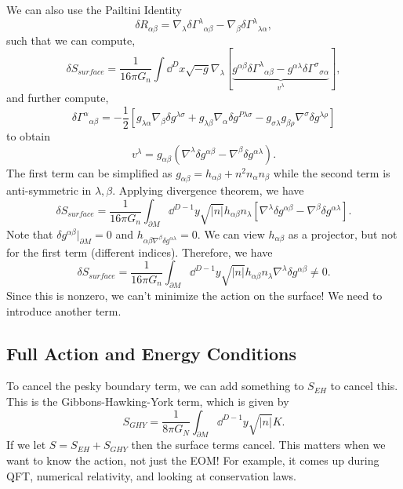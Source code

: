\documentclass{article}
\numberwithin{equation}{section}
\begin{document}
 We can also use the Pailtini Identity 
 \begin{equation}
    \delta R_{\alpha\beta} = \nabla_\lambda \delta \Gamma^{\lambda}{}_{\alpha\beta}- \nabla_\beta \delta\Gamma^{\lambda}{}_{\lambda\alpha},
 \end{equation}
 such that we can compute,
 \begin{equation}
    \delta S_{surface} = \frac{1}{16\pi G_n}\int \dd^{D}{x} \sqrt{-g}\nabla_\lambda\left[\underbrace{g^{\alpha\beta}\delta\Gamma^{\lambda}{}_{\alpha\beta}-g^{\alpha\lambda}\delta \Gamma^{\sigma}{}_{\sigma\alpha}}_{v^{\lambda}}\right],
 \end{equation}
 and further compute,
 \begin{equation}
    \delta \Gamma^{\alpha}{}_{\alpha\beta} = -\frac{1}{2}\left[g_{\lambda\alpha}\nabla_\beta \delta g^{\lambda\sigma} + g_{\lambda\beta}\nabla_\alpha \delta g^{P\lambda\sigma} - g_{\sigma\lambda}g_{\beta\rho}\nabla^{\sigma}\delta g^{\lambda\rho}\right]
 \end{equation}
 to obtain 
 \begin{equation}
    v^{\lambda}=g_{\alpha\beta}(\nabla^\lambda \delta g^{\alpha\beta} - \nabla^\beta \delta g^{\alpha\lambda}).
 \end{equation}
 The first term can be simplified as $g_{\alpha\beta}=h_{\alpha\beta}+n^2 n_{\alpha}n_\beta$ while the second term is anti-symmetric in $\lambda,\beta.$ Applying divergence theorem, we have 
 \begin{equation}
    \delta S_{surface} = \frac{1}{16\pi G_n}\int_{\partial M}\dd^{D-1}y\sqrt{|n|}h_{\alpha\beta}n_{\lambda}\left[\nabla^\lambda \delta g^{\alpha\beta} - \nabla^\beta \delta g^{\alpha \lambda}\right].
 \end{equation}
 Note that $\delta g^{\alpha\beta}|_{\partial M}=0$ and $h_{\alpha\beta\nabla^\beta \delta g^{\alpha\lambda}}=0.$ We can view $h_{\alpha\beta}$ as a projector, but not for the first term (different indices). Therefore, we have 
 \begin{equation}
    \delta S_{surface} = \frac{1}{16\pi G_n}\int_{\partial M}\dd^{D-1}y\sqrt{|n|}h_{\alpha\beta}n_\lambda \nabla^\lambda \delta g^{\alpha\beta}\neq 0.
 \end{equation}
 Since this is nonzero, we can't minimize the action on the surface! We need to introduce another term.
\subsection{Full Action and Energy Conditions}
To cancel the pesky boundary term, we can add something to $S_{EH}$ to cancel this. This is the Gibbons-Hawking-York term, which is given by
\begin{equation}
   S_{GHY} = \frac{1}{8\pi G_N}\int_{\partial M}\dd^{D-1}{y}\sqrt{|n|}K.
\end{equation}
If we let $S=S_{EH}+S_{GHY}$ then the surface terms cancel. This matters when we want to know the action, not just the EOM! For example, it comes up during QFT, numerical relativity, and looking at conservation laws.
\vspace{2mm}
\end{document}
